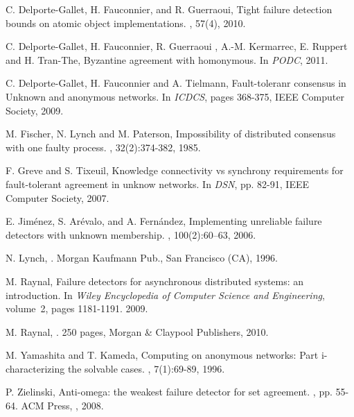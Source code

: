 \documentclass[10pt, conference, compsocconf]{IEEEtran}
\begin{document}
\begin{thebibliography}{10}
{
C. Delporte-Gallet, H. Fauconnier, and R. Guerraoui,
\newblock Tight failure detection bounds on atomic object implementations.
, 57(4), 2010.


C. Delporte-Gallet, H. Fauconnier, R. Guerraoui , A.-M. Kermarrec, 
E. Ruppert   and H. Tran-The,
\newblock Byzantine agreement with homonymous.
\newblock In {\em PODC}, 2011.


C. Delporte-Gallet, H. Fauconnier and A. Tielmann,
\newblock Fault-toleranr consensus in Unknown and anonymous networks. 
\newblock In {\em ICDCS}, pages 368-375, IEEE Computer Society, 2009.



M. Fischer, N.  Lynch  and M.  Paterson,
\newblock Impossibility of distributed consensus with one faulty process.
, 32(2):374-382, 1985.


F. Greve and S. Tixeuil,
Knowledge  connectivity   vs  synchrony  requirements   for  fault-tolerant
agreement in unknow networks. 
In {\em DSN}, pp. 82-91, IEEE Computer Society, 2007.


E. Jim{\'e}nez, S. Ar{\'e}valo, and A. Fern{\'a}ndez,
\newblock Implementing unreliable failure detectors with unknown membership.
, 100(2):60--63, 2006.

N. Lynch,
.
\newblock Morgan Kaufmann Pub., San Francisco (CA), 1996.

M.  Raynal,
\newblock Failure detectors for asynchronous distributed systems: an
  introduction.
\newblock In {\em Wiley Encyclopedia of Computer Science and Engineering},
  volume~2, pages 1181-1191. 2009.

M. Raynal,
. 250 pages, 
\newblock Morgan \& Claypool Publishers, 2010.

M. Yamashita and T.  Kameda,
\newblock Computing on anonymous networks: Part i-characterizing the solvable
  cases.
, 7(1):69-89, 1996.

P. Zielinski,
\newblock Anti-omega: the weakest failure detector for set agreement.
, pp.    55-64. ACM Press, , 2008.

}

\end{thebibliography}
\end{document}
